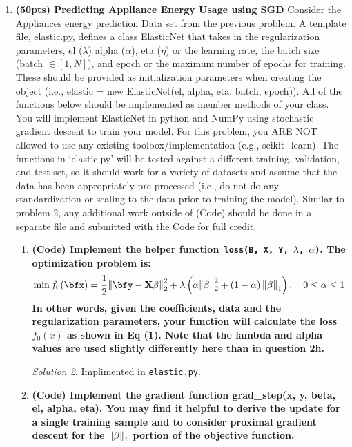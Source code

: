 \documentclass[a4paper,12pt]{article}
\theoremstyle{definition}
\theoremstyle{remark}
\newtheorem*{solution}{Solution}
\newcommand{\half}{\frac{1}{2}}
\begin{document}
\begin{enumerate}
\begin{enumerate}
\begin{solution}
		\end{solution}
		\end{enumerate}
		\item {\bf (50pts) Predicting Appliance Energy Usage using SGD}
		Consider the Appliances energy prediction Data set from the previous problem. A template file,
		elastic.py, defines a class ElasticNet that takes in the regularization parameters, el ($\lambda$) alpha ($\alpha$), eta ($\eta$)
		or the learning rate, the batch size (batch $\in [1, N]$), and epoch or the maximum number of epochs for training. These should be provided as initialization parameters when creating the object (i.e., elastic = new ElasticNet(el, alpha, eta, batch, epoch)). All of the functions below should be
		implemented as member methods of your class.
		You will implement ElasticNet in python and NumPy using stochastic gradient descent to train your model. For this problem, you ARE NOT allowed to use any existing toolbox/implementation (e.g., scikit- learn). The functions in ‘elastic.py’ will be tested against a different training, validation, and test set, so it should work for a variety of datasets and assume that the data has been appropriately pre-processed (i.e., do not do any standardization or scaling to the data prior to training the model). Similar to problem 2, any additional work outside of (Code) should be done in a separate file and submitted with the Code for full credit.
		\begin{enumerate}
		\item {\bf  (Code) Implement the helper function\texttt{ loss(B, X, Y, $\lambda$, $\alpha$)}. The optimization problem is:
			\begin{align}
				\min f_{0}(\bfx) &= \half\norm{\bfy - \mathbf{X\beta}}_2^2 + \lambda\left(\alpha \norm{\mathbf{\beta}}_2^2 + \left( 1-\alpha \right)\norm{\mathbf{\beta}}_1\right), \quad 0\leq \alpha\leq 1
			\end{align}
		In other words, given the coefficients, data and the regularization parameters, your function will calculate the loss $f_{0}(x)$ as shown in Eq (1). Note that the lambda and alpha values are used slightly differently here than in question 2h.}
		\begin{solution}
			Implimented in \texttt{elastic.py}.
		\end{solution}
		\item {\bf (Code) Implement the gradient function grad\_step(x, y, beta, el, alpha, eta). You may find it helpful to derive the update for a single training sample and to consider proximal gradient descent for the $\norm{\beta}_1$ portion of the objective function.
}
\end{enumerate}
\end{enumerate}
\end{document}
